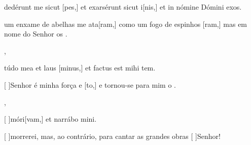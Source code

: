 {  {\item {}dedérunt me sicut [pes,] et exarsérunt sicut i[nis,] et in nómine Dómini exos.~\Antiphona}%
    {\item {} um enxame de abelhas me ata[ram,] como um fogo de espinhos [ram,] mas em nome do Senhor os .~\Antiphona},
  {\item {}túdo mea et laus [minus,] et factus est mihi tem.~\Antiphona}%
    {\item {}[ ]{Se}nhor é minha força e [to,] e tornou-se para mim o .~\Antiphona},
  {\item {}[ ]{mó}ri[vam,] et narrábo \-mi\-ni.~\Antiphona}%
    {\item {}[ ]{mor}rerei, mas, ao contrário,  para cantar as grandes obras [ ]{Se}{nhor}!~\Antiphona}
}